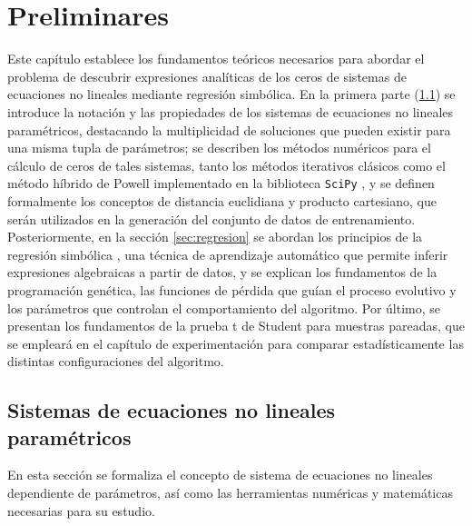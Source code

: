 \chapter{Preliminares}
\label{sec:preliminares}

Este capítulo establece los fundamentos teóricos necesarios para abordar el problema de descubrir expresiones analíticas de los ceros de sistemas de ecuaciones no lineales mediante regresión simbólica. En la primera parte (\ref{sec:sistemas}) se introduce la notación y las propiedades de los sistemas de ecuaciones no lineales paramétricos, destacando la multiplicidad de soluciones que pueden existir para una misma tupla de parámetros; se describen los métodos numéricos para el cálculo de ceros de tales sistemas, tanto los métodos iterativos clásicos como el método híbrido de Powell implementado en la biblioteca \texttt{SciPy} \cite{virtanen2020scipy}, y se definen formalmente los conceptos de distancia euclidiana y producto cartesiano, que serán utilizados en la generación del conjunto de datos de entrenamiento. Posteriormente, en la sección \ref{sec:regresion} se abordan los principios de la regresión simbólica \cite{koza1992genetic}, una técnica de aprendizaje automático que permite inferir expresiones algebraicas a partir de datos, y se explican los fundamentos de la programación genética, las funciones de pérdida que guían el proceso evolutivo y los parámetros que controlan el comportamiento del algoritmo. Por último, se presentan los fundamentos de la prueba t de Student para muestras pareadas, que se empleará en el capítulo de experimentación para comparar estadísticamente las distintas configuraciones del algoritmo.

\section{Sistemas de ecuaciones no lineales paramétricos}
\label{sec:sistemas}

En esta sección se formaliza el concepto de sistema de ecuaciones no lineales dependiente de parámetros, así como las herramientas numéricas y matemáticas necesarias para su estudio.

